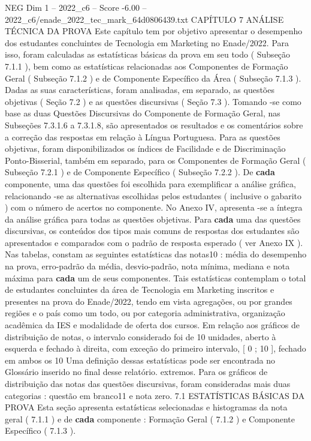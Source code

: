 \begin{textsample}{NEG Dim 1 – 2022\_c6 – Score -6.00 – 2022\_c6/enade\_2022\_tec\_mark\_64d0806439.txt}  \label{ex:f1_neg_182}
CAPÍTULO 7 ANÁLISE TÉCNICA DA PROVA Este capítulo tem por objetivo apresentar o desempenho dos estudantes concluintes de Tecnologia em Marketing no Enade/2022.
Para isso, foram calculadas as estatísticas básicas da prova em seu todo ( Subseção 7.1.1 ), bem como as estatísticas relacionadas aos Componentes de Formação Geral ( Subseção 7.1.2 ) e de Componente Específico da Área ( Subseção 7.1.3 ).
Dadas as suas características, foram analisadas, em separado, as questões objetivas ( Seção 7.2 ) e as questões discursivas ( Seção 7.3 ).
Tomando -se como base as duas Questões Discursivas do Componente de Formação Geral, nas Subseções 7.3.1.6 a 7.3.1.8, são apresentados os resultados e os comentários sobre a correção das respostas em relação à Língua Portuguesa.
Para as questões objetivas, foram disponibilizados os índices de Facilidade e de Discriminação Ponto-Bisserial, também em separado, para os Componentes de Formação Geral ( Subseção 7.2.1 ) e de Componente Específico ( Subseção 7.2.2 ).
De \textbf{cada} componente, uma das questões foi escolhida para exemplificar a análise gráfica, relacionando -se as alternativas escolhidas pelos estudantes ( inclusive o gabarito ) com o número de acertos no componente.
No Anexo IV, apresenta -se a íntegra da análise gráfica para todas as questões objetivas.
Para \textbf{cada} uma das questões discursivas, os conteúdos dos tipos mais comuns de respostas dos estudantes são apresentados e comparados com o padrão de resposta esperado ( ver Anexo IX ).
Nas tabelas, constam as seguintes estatísticas das notas10 : média do desempenho na prova, erro-padrão da média, desvio-padrão, nota mínima, mediana e nota máxima para \textbf{cada} um de seus componentes.
Tais estatísticas contemplam o total de estudantes concluintes da área de Tecnologia em Marketing inscritos e presentes na prova do Enade/2022, tendo em vista agregações, ou por grandes regiões e o país como um todo, ou por categoria administrativa, organização acadêmica da IES e modalidade de oferta dos cursos.
Em relação aos gráficos de distribuição de notas, o intervalo considerado foi de 10 unidades, aberto à esquerda e fechado à direita, com exceção do primeiro intervalo, [ 0 ; 10 ], fechado em ambos os 10 Uma definição dessas estatísticas pode ser encontrada no Glossário inserido no final desse relatório. extremos.
Para os gráficos de distribuição das notas das questões discursivas, foram consideradas mais duas categorias : questão em branco11 e nota zero. 7.1 ESTATÍSTICAS BÁSICAS DA PROVA Esta seção apresenta estatísticas selecionadas e histogramas da nota geral ( 7.1.1 ) e de \textbf{cada} componente : Formação Geral ( 7.1.2 ) e Componente Específico ( 7.1.3 ).

\end{textsample}
